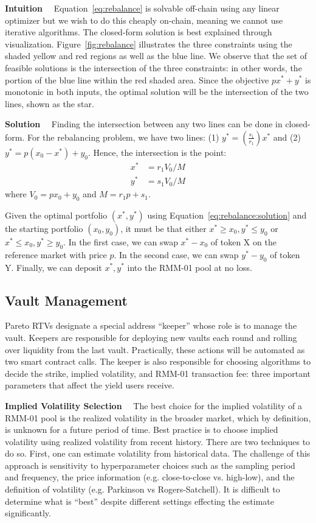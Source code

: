 \documentclass[hidelinks, 12pt]{article}
\begin{document}
\textbf{Intuition}$\quad$ Equation~\ref{eq:rebalance} is solvable off-chain using any linear optimizer but we wish to do this cheaply on-chain, meaning we cannot use iterative algorithms. The closed-form solution is best explained through visualization. Figure~\ref{fig:rebalance} illustrates the three constraints using the shaded yellow and red regions as well as the blue line. We observe that the set of feasible solutions is the intersection of the three constraints: in other words, the portion of the blue line within the red shaded area. Since the objective $p x^* + y^*$ is monotonic in both inputs, the optimal solution will be the intersection of the two lines, shown as the star.

\textbf{Solution}$\quad$ Finding the intersection between any two lines can be done in closed-form. For the rebalancing problem, we have two lines: (1) $y^* = \left(\frac{s_1}{r_1}\right)x^*$ and (2) $y^* = p(x_0 - x^*) + y_0$. Hence, the intersection is the point:
\begin{align}
    x^* &= r_1 V_0 / M \label{eq:rebalance:solution} \\
    y^* &= s_1 V_0 / M \nonumber
\end{align}
where $V_0 = px_0 + y_0$ and $M = r_1 p + s_1$.

Given the optimal portfolio $(x^*, y^*)$ using Equation~\ref{eq:rebalance:solution} and the starting portfolio $(x_0, y_0)$, it must be that either $x^* \geq x_0, y^* \leq y_0$ or $x^* \leq x_0, y^* \geq y_0$. In the first case, we can swap $x^* - x_0$ of token X on the reference market with price $p$. In the second case, we can swap $y^* - y_0$ of token Y. Finally, we can deposit $x^*, y^*$ into the RMM-01 pool at no loss.

\subsection{Vault Management}
\label{sec:management}

Pareto RTVs designate a special address ``keeper'' whose role is to manage the vault. Keepers are responsible for deploying new vaults each round and rolling over liquidity from the last vault. Practically, these actions will be automated as two smart contract calls.
The keeper is also responsible for choosing algorithms to decide the strike, implied volatility, and RMM-01 transaction fee: three important parameters that affect the yield users receive. 

\textbf{Implied Volatility Selection}$\quad$ The best choice for the implied volatility of a RMM-01 pool is the realized volatility in the broader market, which by definition, is unknown for a future period of time. 
Best practice is to choose implied volatility using realized volatility from recent history.
There are two techniques to do so. First, one can estimate volatility from historical data. The challenge of this approach is sensitivity to hyperparameter choices such as the sampling period and frequency, the price information (e.g. close-to-close vs. high-low), and the definition of volatility (e.g. Parkinson vs Rogers-Satchell). 
It is difficult to determine what is ``best'' despite different settings effecting the estimate significantly. 
\end{document}
